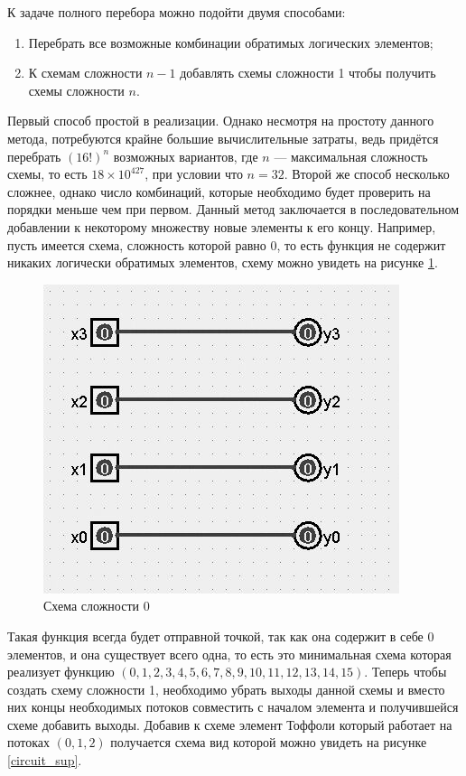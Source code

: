 \documentclass[14pt]{extarticle} %
\begin{document}
 











К задаче полного перебора можно подойти двумя способами:
\begin{enumerate}
	\item Перебрать все возможные комбинации обратимых логических элементов;
	\item К схемам сложности $n-1$ добавлять схемы сложности 1 чтобы получить схемы сложности $n$.
\end{enumerate} 
Первый способ простой в реализации. Однако несмотря на простоту данного метода, потребуются крайне большие вычислительные затраты, ведь придётся перебрать $(16!)^{n}$ возможных вариантов, где $n$ --- максимальная сложность схемы, то есть $18\times 10^{427}$, при условии что $n=32$\cite{1201583}.
Второй же способ несколько сложнее, однако число комбинаций, которые необходимо будет проверить на порядки меньше чем при первом. Данный метод заключается в последовательном добавлении к некоторому множеству новые элементы к его концу. Например, пусть имеется схема, сложность которой равно 0, то есть функция не содержит никаких логически обратимых элементов, схему можно увидеть на рисунке \ref{circuit_0}.

\begin{figure}[h]
	\centering
	\caption{Схема сложности 0}
	\includegraphics[scale=0.4]{img/simple.jpg}
	
	\label{circuit_0}
\end{figure}
 Такая функция всегда будет отправной точкой, так как она содержит в себе 0 элементов, и она существует всего одна, то есть это минимальная схема которая реализует функцию $(0, 1, 2, 3, 4, 5, 6, 7, 8, 9, 10, 11, 12, 13, 14,15)$. Теперь чтобы создать схему сложности 1, необходимо убрать выходы данной схемы и вместо них концы необходимых потоков совместить с началом элемента и получившейся схеме добавить выходы. Добавив к схеме элемент Тоффоли который работает на потоках $(0, 1, 2)$ получается схема вид которой можно увидеть на рисунке \ref{circuit_sup}.
 
\end{document}
